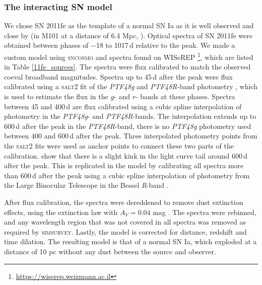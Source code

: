 \documentclass[a4paper,oneside,12pt, class=Latex/Classes/PhDthesisPSnPDF, crop=false]{standalone}
\begin{document}
\subsubsection{The interacting SN model}
\label{model_description}

We chose SN 2011fe as the template of a normal SN Ia as it is well observed and close by (in M101 at a distance of 6.4 Mpc, \citealt{M101_cep_dist}). Optical spectra of SN 2011fe were obtained between phases of $-$18 to 1017\,d relative to the peak. We made a custom model using \textsc{sncosmo} and spectra found on WISeREP \citep{wiserep}\footnote{\url{https://wiserep.weizmann.ac.il}}, which are listed in Table \ref{11fe_sources}. The spectra were flux calibrated to match the observed coeval broadband magnitudes. Spectra up to 45\,d after the peak were flux calibrated using a \textsc{salt2} \citep{salt2} fit of the \textit{PTF48g} and \textit{PTF48R}-band photometry \citep{PTF_1, PTF_2}, which is used to estimate the flux in the $g$- and $r$- bands at these phases. Spectra between 45 and 400\,d are flux calibrated using a cubic spline interpolation of photometry in the \textit{PTF48g}- and \textit{PTF48R}-bands. The interpolation extends up to 600\,d after the peak in the \textit{PTF48R}-band, there is no \textit{PTF48g} photometry used between 400 and 600\,d after the peak. Three interpolated photometry points from the \textsc{salt2} fits were used as anchor points to connect these two parts of the calibration. \citet{Georgios_11fe} show that there is a slight kink in the light curve tail around 600\,d after the peak. This is replicated in the model by calibrating all spectra more than 600\,d after the peak using a cubic spline interpolation of photometry from the Large Binocular Telescope \citep[LBT;][]{LBT} in the Bessel \textit{R}-band \citep{Shappee_11fe}.

After flux calibration, the spectra were dereddened to remove dust extinction effects, using the \citet{ccm89_extinction_law} extinction law with $A_V = 0.04$ mag \citep{extinction_Av}. The spectra were rebinned, and any wavelength region that was not covered in all spectra was removed as required by \textsc{simsurvey}. Lastly, the model is corrected for distance, redshift and time dilation. The resulting model is that of a normal SN Ia, which exploded at a distance of 10 pc without any dust between the source and observer.
\end{document}
